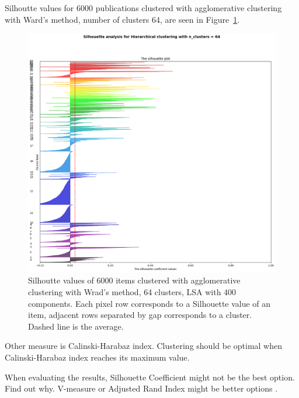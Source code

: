 Silhoutte values for 6000 publications clustered with 
agglomerative clustering with Ward's method, number of clusters 
64, are seen in Figure~\ref{fig:silh01}.
\begin{figure}[ht]
  \begin{center}    
\includegraphics[width=13cm]{images/6000-64-400-Hierarchical-silhouette-plot.png}
    \caption{Silhoutte values of 6000 items clustered with 
    agglomerative clustering with Wrad's method, 64 clusters, 
    LSA with 400 components. Each pixel row corresponds to a 
    Silhouette value of an item, adjacent rows separated by gap 
    corresponds to a cluster.
    Dashed line is the average.}
    \label{fig:silh01}
  \end{center}
\end{figure}

Other measure is Calinski-Harabaz index. Clustering should be 
optimal when Calinski-Harabaz index reaches its maximum value. 
\cite{}

When evaluating the results, Silhouette Coefficient might not be
the best option. Find out why. V-measure or Adjusted Rand Index
might be better options \cite{noauthor_clustering_nodate}.


